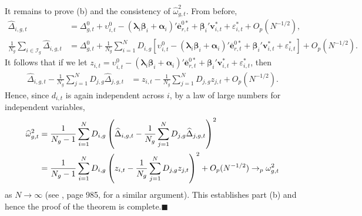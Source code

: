 \documentclass[12pt,fleqn]{article}
\def\*#1{\mathbf{#1}}
\def\+#1{\boldsymbol{#1}}
\begin{document}
It remains to prove (b) and the consistency of $\widehat \omega_{g,t}^2$. From before,
\begin{align}
\widehat \Delta_{i,g,t} & = \Delta_{g,t}^0 + \upsilon_{i,t}^0 - (\+\lambda_i\+\beta_i + \+\alpha_i)'\overline{\*e}_{r,t}^{0\ast} + \+\beta_i'\*v_{i,t}^* + \varepsilon_{i,t}^* + O_p(N^{-1/2}), \\
\frac{1}{N_g}\sum_{i\in \mathcal{I}_g} \widehat \Delta_{i,g,t} & = \Delta_{g,t}^0+ \frac{1}{N_g}\sum_{i= 1}^{N} D_{i,g} [\upsilon_{i,t}^0 - (\+\lambda_i\+\beta_i + \+\alpha_i)'\overline{\*e}_{r,t}^{0\ast} + \+\beta_i'\*v_{i,t}^* + \varepsilon_{i,t}^*] + O_p(N^{-1/2}).
\end{align}
It follows that if we let $z_{i,t} = \upsilon_{i,t}^0 - (\+\lambda_i\+\beta_i + \+\alpha_i)'\overline{\*e}_{r,t}^{0\ast} + \+\beta_i'\*v_{i,t}^* + \varepsilon_{i,t}^*$, then
\begin{align}
\widehat \Delta_{i,g,t}  - \frac{1}{N_g}\sum_{j = 1}^{N} D_{j,g} \widehat \Delta_{j,g,t} & = z_{i,t}  - \frac{1}{N_g}\sum_{j= 1}^{N} D_{j,g} z_{j,t} + O_p(N^{-1/2}).
\end{align}
Hence, since $d_{i,t}$ is again independent across $i$, by a law of large numbers for independent variables,
\begin{align}
\widehat \omega_{g,t}^2 & = \frac{1}{N_g-1}\sum_{i= 1}^{N} D_{i,g}\left(\widehat \Delta_{i,g,t}  - \frac{1}{N_g}\sum_{j= 1}^{N} D_{j,g} \widehat \Delta_{j,g,t}\right)^2 \notag\\
& = \frac{1}{N_g-1} \sum_{i= 1}^{N} D_{i,g} \left(z_{i,t}  - \frac{1}{N_g} \sum_{j = 1}^{N} D_{j,g} z_{j,t}\right)^2 + O_p(N^{-1/2}) \to_p \omega_{g,t}^2
\end{align}
as $N\to\infty$ (see \citealp{pesaran2006estimation}, page 985, for a similar argument). This establishes part (b) and hence the proof of the theorem is complete.\hfill{$\blacksquare$}
\end{document}

